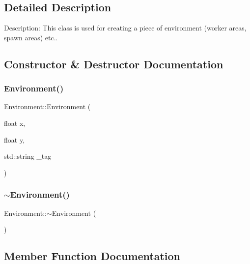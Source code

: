 \subsection{Detailed Description}
Description\+: This class is used for creating a piece of environment (worker areas, spawn areas) etc.. 

\subsection{Constructor \& Destructor Documentation}
\mbox{\label{class_environment_a26ec69a91e421bfe6a12c7f17955fa9b}} 
\subsubsection{\texorpdfstring{Environment()}{Environment()}}
{\footnotesize\ttfamily Environment\+::\+Environment (\begin{DoxyParamCaption}\item[{float}]{x,  }\item[{float}]{y,  }\item[{std\+::string}]{\+\_\+tag }\end{DoxyParamCaption})}

\mbox{\label{class_environment_a8e294735187880dd3d59be10c425b29d}} 
\subsubsection{\texorpdfstring{$\sim$Environment()}{~Environment()}}
{\footnotesize\ttfamily Environment\+::$\sim$\+Environment (\begin{DoxyParamCaption}{ }\end{DoxyParamCaption})}



\subsection{Member Function Documentation}
\mbox{\label{class_environment_a991c9538f0da2c606359517f83f3fa28}} 
